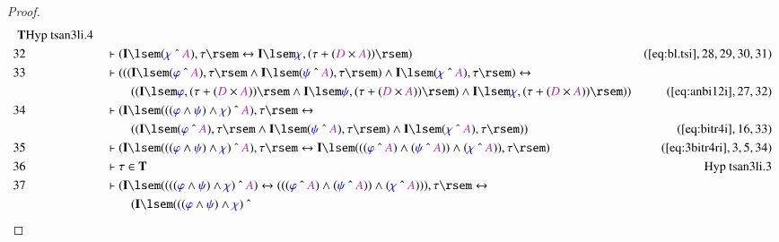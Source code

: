 \begin{proof}
\begin{align}
      \mathbf{T}&\text{Hyp~tsan3li.4}\notag%
  \\ 32 &&  & \vdash ( \mathbf{I} \lsem ( \mw{\chi} ~\string^~ \mc{A} ) , \tau
      \rsem \leftrightarrow \mathbf{I} \lsem \mw{\chi} , (
      \tau + ( \mc{D} \times \mc{A} ) ) \rsem
      )&(\mbox{\ref{eq:bl.tsi}},28,29,30,31)\notag
  \\ 33 &&  & \vdash ( ( ( \mathbf{I} \lsem ( \mw{\varphi} ~\string^~ \mc{A} )
      , \tau \rsem \wedge \mathbf{I} \lsem ( \mw{\psi}
      ~\string^~ \mc{A} ) , \tau \rsem ) \wedge \mathbf{I}
      \lsem ( \mw{\chi} ~\string^~ \mc{A} ) , \tau \rsem )
      \leftrightarrow  \notag \\ & & & \qquad
     ( ( \mathbf{I} \lsem \mw{\varphi} , (
      \tau + ( \mc{D} \times \mc{A} ) ) \rsem \wedge
      \mathbf{I} \lsem \mw{\psi} , ( \tau + ( \mc{D} \times
      \mc{A} ) ) \rsem ) \wedge \mathbf{I} \lsem \mw{\chi}
      , ( \tau + ( \mc{D} \times \mc{A} ) ) \rsem )
      )&(\mbox{\ref{eq:anbi12i}},27,32)\notag
  \\ 34 &&  & \vdash ( \mathbf{I} \lsem ( ( ( \mw{\varphi} \wedge \mw{\psi} )
      \wedge \mw{\chi} ) ~\string^~ \mc{A} ) , \tau \rsem
      \leftrightarrow  \notag \\ & & & \qquad
     ( ( \mathbf{I} \lsem ( \mw{\varphi}
      ~\string^~ \mc{A} ) , \tau \rsem \wedge \mathbf{I}
      \lsem ( \mw{\psi} ~\string^~ \mc{A} ) , \tau \rsem )
      \wedge \mathbf{I} \lsem ( \mw{\chi} ~\string^~ \mc{A}
      ) , \tau \rsem )
      )&(\mbox{\ref{eq:bitr4i}},16,33)\notag
  \\ 35 &&  & \vdash ( \mathbf{I} \lsem ( ( ( \mw{\varphi} \wedge \mw{\psi} )
      \wedge \mw{\chi} ) ~\string^~ \mc{A} ) , \tau \rsem
      \leftrightarrow \mathbf{I} \lsem ( ( ( \mw{\varphi}
      ~\string^~ \mc{A} ) \wedge ( \mw{\psi} ~\string^~
      \mc{A} ) ) \wedge ( \mw{\chi} ~\string^~ \mc{A} ) ) ,
      \tau \rsem )&(\mbox{\ref{eq:3bitr4ri}},3,5,34)\notag
  \\ 36 &&  & \vdash \tau \in
      \mathbf{T}&\text{Hyp~tsan3li.3}\notag%
  \\ 37 &&  & \vdash ( \mathbf{I} \lsem ( ( ( ( \mw{\varphi} \wedge \mw{\psi} )
      \wedge \mw{\chi} ) ~\string^~ \mc{A} )
      \leftrightarrow ( ( ( \mw{\varphi} ~\string^~ \mc{A}
      ) \wedge ( \mw{\psi} ~\string^~ \mc{A} ) ) \wedge (
      \mw{\chi} ~\string^~ \mc{A} ) ) ) , \tau \rsem
      \leftrightarrow \notag \\ & & & \qquad
      ( \mathbf{I} \lsem ( ( ( \mw{\varphi}
      \wedge \mw{\psi} ) \wedge \mw{\chi} ) ~\string^~

\end{align}
\end{proof}
